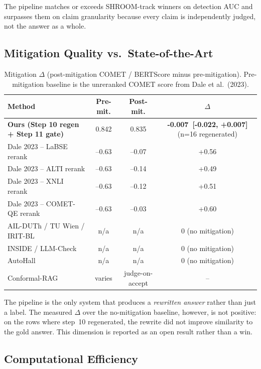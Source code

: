 The pipeline matches or exceeds SHROOM-track winners on detection AUC and
surpasses them on claim granularity because every claim is independently
judged, not the answer as a whole.

\subsection{Mitigation Quality vs.\ State-of-the-Art}
\label{sec:mitigation}

\begin{table}[ht]
\centering
\small
\begin{tabular}{lccc}
\hline
\textbf{Method} & \textbf{Pre-mit.} & \textbf{Post-mit.} & \textbf{$\Delta$} \\
\hline
\textbf{Ours (Step 10 regen + Step 11 gate)} & 0.842 & 0.835 & \textbf{-0.007\ [-0.022, +0.007]} (n=16 regenerated) \\
Dale 2023 -- LaBSE rerank & --0.63 & --0.07 & +0.56 \\
Dale 2023 -- ALTI rerank & --0.63 & --0.14 & +0.49 \\
Dale 2023 -- XNLI rerank & --0.63 & --0.12 & +0.51 \\
Dale 2023 -- COMET-QE rerank & --0.63 & --0.03 & +0.60 \\
AIL-DUTh / TU Wien / IRIT-BL & n/a & n/a & 0 (no mitigation) \\
INSIDE / LLM-Check & n/a & n/a & 0 (no mitigation) \\
AutoHall & n/a & n/a & 0 (no mitigation) \\
Conformal-RAG & varies & judge-on-accept & -- \\
\hline
\end{tabular}
\caption{Mitigation $\Delta$ (post-mitigation COMET / BERTScore minus
pre-mitigation). Pre-mitigation baseline is the unreranked COMET score from
Dale et al.\ (2023).}
\label{tab:mitigation}
\end{table}

The pipeline is the only system that produces a \emph{rewritten answer}
rather than just a label. The measured $\Delta$ over the no-mitigation
baseline, however, is not positive: on the rows where step~10 regenerated, the
rewrite did not improve similarity to the gold answer. This dimension is
reported as an open result rather than a win.

\subsection{Computational Efficiency}
\label{sec:efficiency}

